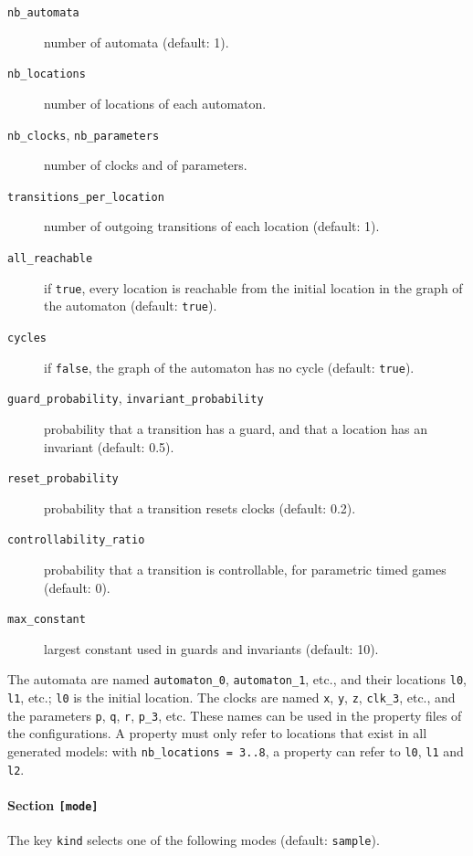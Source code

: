 \begin{description}
	\item[\texttt{nb\_automata}] number of automata (default: 1).
	\item[\texttt{nb\_locations}] number of locations of each automaton.
	\item[\texttt{nb\_clocks}, \texttt{nb\_parameters}] number of clocks and of parameters.
	\item[\texttt{transitions\_per\_location}] number of outgoing transitions of each location (default: 1).
	\item[\texttt{all\_reachable}] if \texttt{true}, every location is reachable from the initial location in the graph of the automaton (default: \texttt{true}).
	\item[\texttt{cycles}] if \texttt{false}, the graph of the automaton has no cycle (default: \texttt{true}).
	\item[\texttt{guard\_probability}, \texttt{invariant\_probability}] probability that a transition has a guard, and that a location has an invariant (default: 0.5).
	\item[\texttt{reset\_probability}] probability that a transition resets clocks (default: 0.2).
	\item[\texttt{controllability\_ratio}] probability that a transition is controllable, for parametric timed games (default: 0).
	\item[\texttt{max\_constant}] largest constant used in guards and invariants (default: 10).
\end{description}

The automata are named \texttt{automaton\_0}, \texttt{automaton\_1}, etc., and their locations \texttt{l0}, \texttt{l1}, etc.; \texttt{l0} is the initial location.
The clocks are named \texttt{x}, \texttt{y}, \texttt{z}, \texttt{clk\_3}, etc., and the parameters \texttt{p}, \texttt{q}, \texttt{r}, \texttt{p\_3}, etc.
These names can be used in the property files of the configurations.
A property must only refer to locations that exist in all generated models: with \texttt{nb\_locations = 3..8}, a property can refer to \texttt{l0}, \texttt{l1} and \texttt{l2}.

\paragraph{Section \texttt{[mode]}}
The key \texttt{kind} selects one of the following modes (default: \texttt{sample}).

